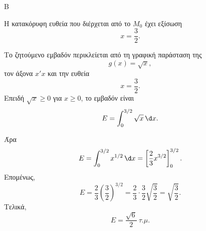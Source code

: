 \begin{thema}{Β}
\begin{erwthma}
\item Η κατακόρυφη ευθεία που διέρχεται από το $M_0$ έχει εξίσωση
\[
x=\frac{3}{2}.
\]

Το ζητούμενο εμβαδόν περικλείεται από τη γραφική παράσταση της
\[
g(x)=\sqrt{x},
\]
τον άξονα $x'x$ και την ευθεία
\[
x=\frac{3}{2}.
\]
Επειδή $\sqrt{x}\geq 0$ για $x\geq 0$, το εμβαδόν είναι
\[
E=\int_0^{3/2}\sqrt{x}\,\d x.
\]

Άρα
\[
E=\int_0^{3/2}x^{1/2}\,\d x
=\left[\frac{2}{3}x^{3/2}\right]_0^{3/2}.
\]
Επομένως,
\[
E=\frac{2}{3}\left(\frac{3}{2}\right)^{3/2}
=\frac{2}{3}\cdot \frac{3}{2}\sqrt{\frac{3}{2}}
=\sqrt{\frac{3}{2}}.
\]
Τελικά,
\[
E=\frac{\sqrt{6}}{2}\ \tau.\mu.
\]
\end{erwthma}
\end{thema}



